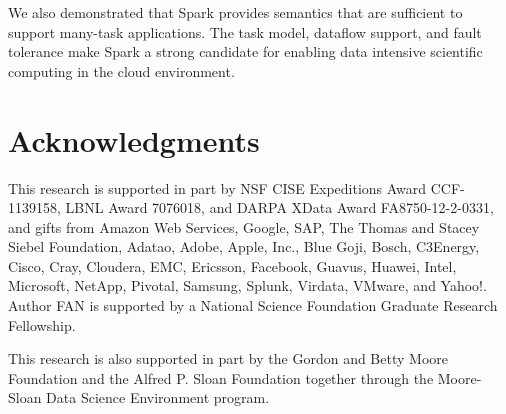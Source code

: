 \documentclass[10pt, conference, compsocconf]{IEEEtran}
\begin{document}
We also demonstrated that Spark provides semantics that are sufficient to support many-task
applications. The task model, dataflow support, and fault
tolerance make Spark a strong candidate for enabling data intensive scientific computing
in the cloud environment.

\section{Acknowledgments}

This research is supported in part by NSF CISE Expeditions Award CCF-1139158, LBNL Award 7076018, and DARPA XData Award FA8750-12-2-0331, and gifts from Amazon Web Services, Google, SAP,  The Thomas and Stacey Siebel Foundation, Adatao, Adobe, Apple, Inc., Blue Goji, Bosch, C3Energy, Cisco, Cray, Cloudera, EMC, Ericsson, Facebook, Guavus, Huawei, Intel, Microsoft, NetApp, Pivotal, Samsung, Splunk, Virdata, VMware, and Yahoo!. Author FAN is supported by a National Science Foundation Graduate Research Fellowship.

This research is also supported in part by the Gordon and Betty Moore
Foundation and the Alfred P. Sloan Foundation together through the
Moore-Sloan Data Science Environment program.
%

%
%




\end{document}
